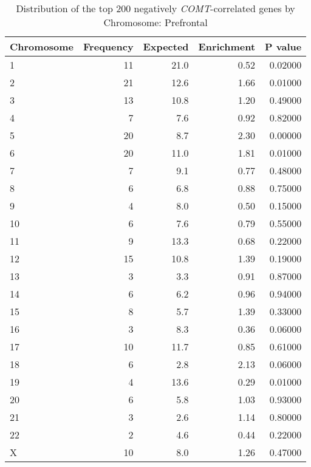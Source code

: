 \begin{longtable}{lrrrr}
\caption{Distribution of the top 200 negatively \textit{COMT}-correlated genes by \\ Chromosome: Prefrontal} \\ 
  \toprule
Chromosome & Frequency & Expected & Enrichment & P value \\ 
  \midrule
1 & 11 & 21.0 & 0.52 & 0.02000 \\ 
  2 & 21 & 12.6 & 1.66 & 0.01000 \\ 
  3 & 13 & 10.8 & 1.20 & 0.49000 \\ 
  4 & 7 & 7.6 & 0.92 & 0.82000 \\ 
  5 & 20 & 8.7 & 2.30 & 0.00000 \\ 
  6 & 20 & 11.0 & 1.81 & 0.01000 \\ 
  7 & 7 & 9.1 & 0.77 & 0.48000 \\ 
  8 & 6 & 6.8 & 0.88 & 0.75000 \\ 
  9 & 4 & 8.0 & 0.50 & 0.15000 \\ 
  10 & 6 & 7.6 & 0.79 & 0.55000 \\ 
  11 & 9 & 13.3 & 0.68 & 0.22000 \\ 
  12 & 15 & 10.8 & 1.39 & 0.19000 \\ 
  13 & 3 & 3.3 & 0.91 & 0.87000 \\ 
  14 & 6 & 6.2 & 0.96 & 0.94000 \\ 
  15 & 8 & 5.7 & 1.39 & 0.33000 \\ 
  16 & 3 & 8.3 & 0.36 & 0.06000 \\ 
  17 & 10 & 11.7 & 0.85 & 0.61000 \\ 
  18 & 6 & 2.8 & 2.13 & 0.06000 \\ 
  19 & 4 & 13.6 & 0.29 & 0.01000 \\ 
  20 & 6 & 5.8 & 1.03 & 0.93000 \\ 
  21 & 3 & 2.6 & 1.14 & 0.80000 \\ 
  22 & 2 & 4.6 & 0.44 & 0.22000 \\ 
  X & 10 & 8.0 & 1.26 & 0.47000 \\ 
   \bottomrule
\end{longtable}
